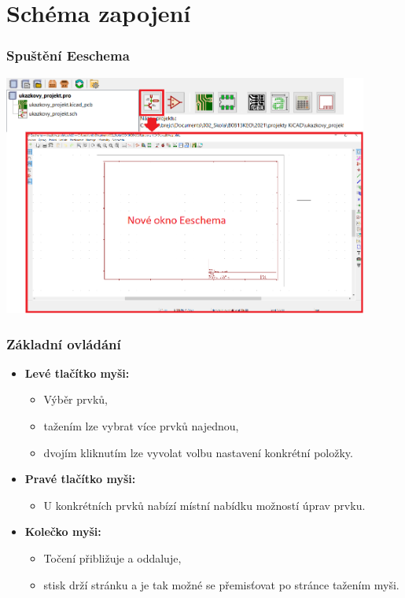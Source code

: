 \documentclass{beamer}
\begin{document}
\section{\texorpdfstring{Schéma zapojení}{Schema zapojeni}}
\begin{frame}
	\frametitle{Spuštění Eeschema}

		\begin{center}
			\includegraphics[width=0.9\textwidth]{obr/Eeschema.png}
		\end{center}
		
\end{frame}
\begin{frame}
	\frametitle{Základní ovládání}
	
	\begin{itemize}
		\item \textbf{Levé tlačítko myši:}
		
		\begin{itemize}
			\item Výběr prvků,
			\item tažením lze vybrat více prvků najednou,
			\item dvojím kliknutím lze vyvolat volbu nastavení konkrétní položky.
		\end{itemize}
		
		\item \textbf{Pravé tlačítko myši:}
		
		\begin{itemize}
			\item U konkrétních prvků nabízí místní nabídku možností úprav prvku.
		\end{itemize}
		
		\item \textbf{Kolečko myši:}
		
		\begin{itemize}
			\item Točení přibližuje a oddaluje,
			\item stisk drží stránku a je tak možné se přemisťovat po stránce tažením myši.
		\end{itemize}
		
	\end{itemize}
		
\end{frame}
\end{document}

